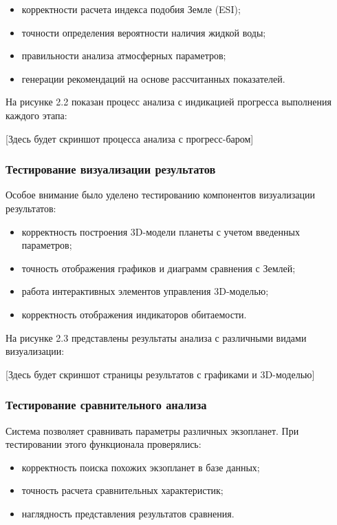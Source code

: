 \begin{itemize}
    \item корректности расчета индекса подобия Земле (ESI);
    \item точности определения вероятности наличия жидкой воды;
    \item правильности анализа атмосферных параметров;
    \item генерации рекомендаций на основе рассчитанных показателей.
\end{itemize}

На рисунке 2.2 показан процесс анализа с индикацией прогресса выполнения каждого этапа:

[Здесь будет скриншот процесса анализа с прогресс-баром]

\subsubsection{Тестирование визуализации результатов}

Особое внимание было уделено тестированию компонентов визуализации результатов:

\begin{itemize}
    \item корректность построения 3D-модели планеты с учетом введенных параметров;
    \item точность отображения графиков и диаграмм сравнения с Землей;
    \item работа интерактивных элементов управления 3D-моделью;
    \item корректность отображения индикаторов обитаемости.
\end{itemize}

На рисунке 2.3 представлены результаты анализа с различными видами визуализации:

[Здесь будет скриншот страницы результатов с графиками и 3D-моделью]

\subsubsection{Тестирование сравнительного анализа}

Система позволяет сравнивать параметры различных экзопланет. При тестировании этого функционала проверялись:

\begin{itemize}
    \item корректность поиска похожих экзопланет в базе данных;
    \item точность расчета сравнительных характеристик;
    \item наглядность представления результатов сравнения.
\end{itemize}

